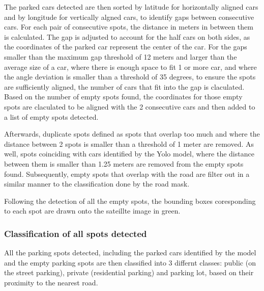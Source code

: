 The parked cars detected are then sorted by latitude for horizontally aligned cars and by longitude for vertically algned cars, to identify gaps between consecutive cars.
For each pair of consecutive spots, the distance in meters in between them is calculated. The gap is adjusted to account for the half cars on both sides, as the coordinates of the parked car represent the center of the car.
For the gaps smaller than the maximum gap threshold of 12 meters and larger than the average size of a car, where there is enough space to fit 1 or more car, and where the angle deviation is smaller than a threshold of 35 degrees, to ensure the spots are sufficiently aligned, the number of cars that fit into the gap is claculated.
Based on the number of empty spots found, the coordinates for those empty spots are claculated to be aligned with the 2 consecutive cars and then added to a list of empty spots detected.

Afterwards, duplicate spots defined as spots that overlap too much and where the distance between 2 spots is smaller than a threshold of 1 meter are removed.
As well, spots coinciding with cars identified by the Yolo model, where the distance between them is smaller than 1.25 meters are removed from the empty spots found.
Subsequently, empty spots that overlap with the road are filter out in a similar manner to the classification done by the road mask.

Following the detection of all the empty spots, the bounding boxes coresponding to each spot are drawn onto the sateillte image in green.

\subsubsection{Classification of all spots detected}
All the parking spots detected, including the parked cars identified by the model and the empty parking spots are then classified into 3 differnt classes: public (on the street parking), private (residential parking) and parking lot, based on their proximity to the nearest road.

